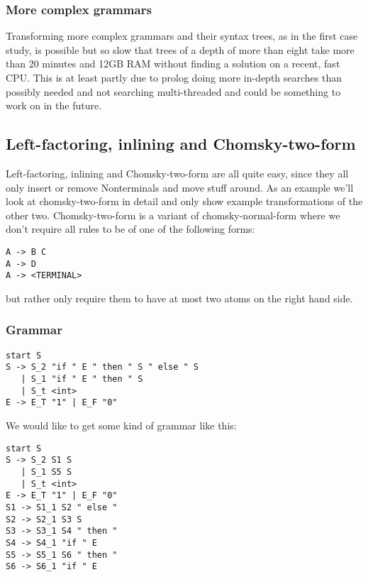 \documentclass[a4paper]{article}
\begin{document}
\subsubsection*{More complex grammars}
Transforming more complex grammars and their syntax trees, as in the first case study, is possible but so slow that trees of a depth of more than eight take more than 20 minutes and 12GB RAM without finding a solution on a recent, fast CPU. This is at least partly due to prolog doing more in-depth searches than possibly needed and not searching multi-threaded and could be something to work on in the future.

\subsection*{Left-factoring, inlining and Chomsky-two-form}
Left-factoring, inlining and Chomsky-two-form are all quite easy, since they all only insert or remove Nonterminals and move stuff around. As an example we'll look at chomsky-two-form in detail and only show example transformations of the other two. Chomsky-two-form is a variant of chomsky-normal-form where we don't require all rules to be of one of the following forms:
\begin{verbatim}
A -> B C
A -> D
A -> <TERMINAL>
\end{verbatim}
but rather only require them to have at most two atoms on the right hand side.
\subsubsection*{Grammar}
\begin{lstlisting}[language=grammar]
start S
S -> S_2 "if " E " then " S " else " S 
   | S_1 "if " E " then " S 
   | S_t <int>
E -> E_T "1" | E_F "0"
\end{lstlisting}
We would like to get some kind of grammar like this:
\begin{lstlisting}[language=grammar]
start S
S -> S_2 S1 S 
   | S_1 S5 S 
   | S_t <int>
E -> E_T "1" | E_F "0"
S1 -> S1_1 S2 " else "
S2 -> S2_1 S3 S
S3 -> S3_1 S4 " then "
S4 -> S4_1 "if " E
S5 -> S5_1 S6 " then "
S6 -> S6_1 "if " E
\end{lstlisting}
\end{document}
